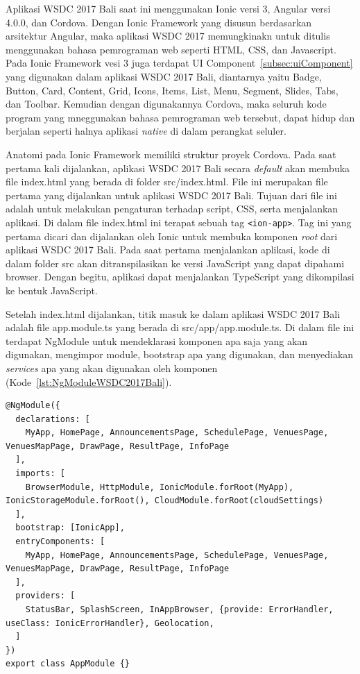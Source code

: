 Aplikasi WSDC 2017 Bali saat ini menggunakan Ionic versi 3, Angular versi 4.0.0, dan Cordova. Dengan Ionic Framework yang disusun berdasarkan arsitektur Angular, maka aplikasi WSDC 2017 memungkinakn untuk ditulis menggunakan bahasa pemrograman web seperti HTML, CSS, dan Javascript. Pada Ionic Framework vesi 3 juga terdapat UI Component~\ref{subsec:uiComponent} yang digunakan dalam aplikasi WSDC 2017 Bali, diantarnya yaitu Badge, Button, Card, Content, Grid, Icons, Items, List, Menu, Segment, Slides, Tabs, dan Toolbar. Kemudian dengan digunakannya Cordova, maka seluruh kode program yang mneggunakan bahasa pemrograman web tersebut, dapat hidup dan berjalan seperti halnya aplikasi \textit{native} di dalam perangkat seluler.

Anatomi pada Ionic Framework memiliki struktur proyek Cordova. Pada saat pertama kali dijalankan, aplikasi WSDC 2017 Bali secara \textit{default} akan membuka file index.html yang berada di folder src/index.html. File ini merupakan file pertama yang dijalankan untuk aplikasi WSDC 2017 Bali. Tujuan dari file ini adalah untuk melakukan pengaturan terhadap script, CSS, serta menjalankan aplikasi. Di dalam file index.html ini terapat sebuah tag \texttt{<ion-app>}. Tag ini yang pertama dicari dan dijalankan oleh Ionic untuk  membuka komponen \textit{root} dari aplikasi WSDC 2017 Bali. Pada saat pertama menjalankan aplikasi, kode di dalam folder src akan ditranspilasikan ke versi JavaScript yang dapat dipahami browser. Dengan begitu, aplikasi dapat menjalankan TypeScript yang dikompilasi ke bentuk JavaScript.

Setelah index.html dijalankan, titik masuk ke dalam aplikasi WSDC 2017 Bali adalah file app.module.ts yang berada di src/app/app.module.ts. Di dalam file ini terdapat NgModule untuk mendeklarasi komponen apa saja yang akan digunakan, mengimpor module, bootstrap apa yang digunakan, dan menyediakan \textit{services} apa yang akan digunakan oleh komponen (Kode~\ref{lst:NgModuleWSDC2017Bali}).  

\begin{lstlisting}[label={lst:NgModuleWSDC2017Bali}, caption=NgModule pada app.module.ts]
@NgModule({
  declarations: [
    MyApp, HomePage, AnnouncementsPage, SchedulePage, VenuesPage, VenuesMapPage, DrawPage, ResultPage, InfoPage
  ],
  imports: [
    BrowserModule, HttpModule, IonicModule.forRoot(MyApp), IonicStorageModule.forRoot(), CloudModule.forRoot(cloudSettings)
  ],
  bootstrap: [IonicApp],
  entryComponents: [
    MyApp, HomePage, AnnouncementsPage, SchedulePage, VenuesPage, VenuesMapPage, DrawPage, ResultPage, InfoPage
  ],
  providers: [
    StatusBar, SplashScreen, InAppBrowser, {provide: ErrorHandler, useClass: IonicErrorHandler}, Geolocation,
  ]
})
export class AppModule {}
\end{lstlisting} 

